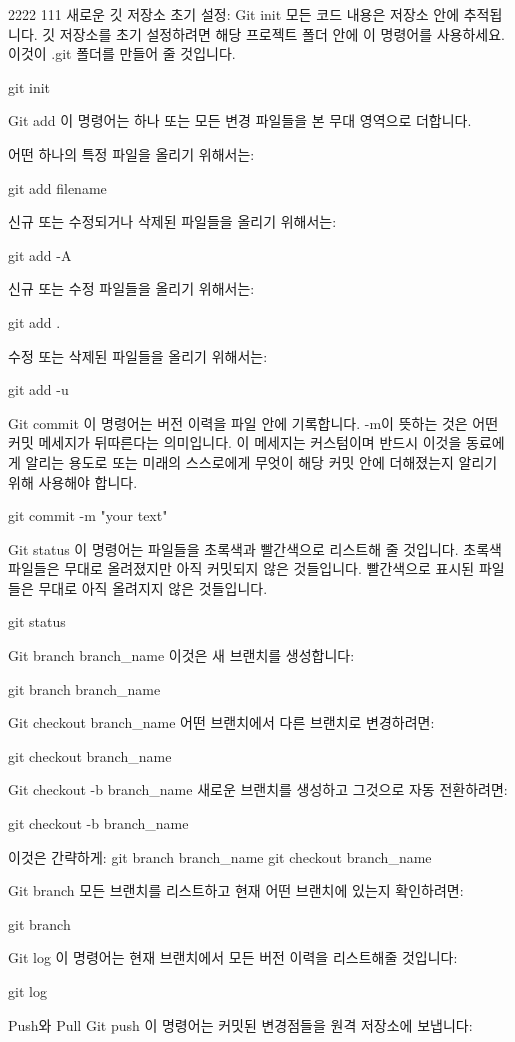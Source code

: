 2222
111
새로운 깃 저장소 초기 설정: Git init
모든 코드 내용은 저장소 안에 추적됩니다. 깃 저장소를 초기 설정하려면 해당 프로젝트 폴더 안에 이 명령어를 사용하세요. 이것이 .git 폴더를 만들어 줄 것입니다.

git init

Git add
이 명령어는 하나 또는 모든 변경 파일들을 본 무대 영역으로 더합니다.

어떤 하나의 특정 파일을 올리기 위해서는:

git add filename

신규 또는 수정되거나 삭제된 파일들을 올리기 위해서는:

git add -A

신규 또는 수정 파일들을 올리기 위해서는:

git add .

수정 또는 삭제된 파일들을 올리기 위해서는:

git add -u

Git commit
이 명령어는 버전 이력을 파일 안에 기록합니다. -m이 뜻하는 것은 어떤 커밋 메세지가 뒤따른다는 의미입니다. 이 메세지는 커스텀이며 반드시 이것을 동료에게 알리는 용도로 또는 미래의 스스로에게 무엇이 해당 커밋 안에 더해졌는지 알리기 위해 사용해야 합니다.

git commit -m "your text"

Git status
이 명령어는 파일들을 초록색과 빨간색으로 리스트해 줄 것입니다. 초록색 파일들은 무대로 올려졌지만 아직 커밋되지 않은 것들입니다. 빨간색으로 표시된 파일들은 무대로 아직 올려지지 않은 것들입니다.

git status

Git branch branch_name
이것은 새 브랜치를 생성합니다:

git branch branch_name

Git checkout branch_name
어떤 브랜치에서 다른 브랜치로 변경하려면:

git checkout branch_name

Git checkout -b branch_name
새로운 브랜치를 생성하고 그것으로 자동 전환하려면:

git checkout -b branch_name

이것은 간략하게:
git branch branch_name
git checkout branch_name


Git branch
모든 브랜치를 리스트하고 현재 어떤 브랜치에 있는지 확인하려면:

git branch

Git log
이 명령어는 현재 브랜치에서 모든 버전 이력을 리스트해줄 것입니다:

git log

Push와 Pull
Git push
이 명령어는 커밋된 변경점들을 원격 저장소에 보냅니다:

